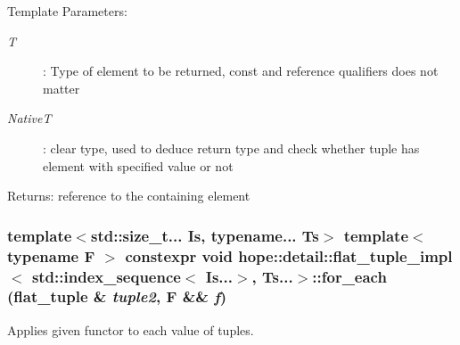 \begin{Desc}
\item[Template Parameters:]
\begin{description}
\item[{\em T}]: Type of element to be returned, const and reference qualifiers does not matter\item[{\em NativeT}]: clear type, used to deduce return type and check whether tuple has element with specified value or not\end{description}
\end{Desc}
\begin{Desc}
\item[Returns:]reference to the containing element \end{Desc}
\hypertarget{classhope_1_1detail_1_1flat__tuple__impl_3_01std_1_1index__sequence_3_01_is_8_8_8_4_00_01_ts_8_8_8_4_90c90aefa83c884fc686a98175d8fcd6}{
\subsubsection[{for\_\-each}]{\setlength{\rightskip}{0pt plus 5cm}template$<$std::size\_\-t... Is, typename... Ts$>$ template$<$typename F $>$ constexpr void hope::detail::flat\_\-tuple\_\-impl$<$ std::index\_\-sequence$<$ Is...$>$, Ts...$>$::for\_\-each (flat\_\-tuple \& {\em tuple2}, \/  F \&\& {\em f})}}
\label{classhope_1_1detail_1_1flat__tuple__impl_3_01std_1_1index__sequence_3_01_is_8_8_8_4_00_01_ts_8_8_8_4_90c90aefa83c884fc686a98175d8fcd6}


Applies given functor to each value of tuples. 


